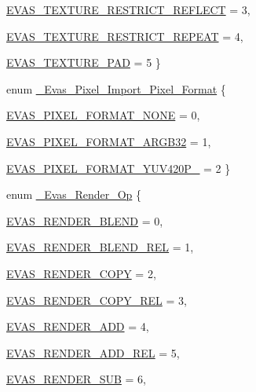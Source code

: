 \begin{DoxyCompactItemize}
\par
\hyperlink{Evas_8h_a830349cff0c676505905e79e1db0f738a34c9c1dc969b6a96aa9d38dbf8243f85}{EVAS\_\-TEXTURE\_\-RESTRICT\_\-REFLECT} =  3, 
\par
\hyperlink{Evas_8h_a830349cff0c676505905e79e1db0f738aa837b70d06a327c423456b5344163f43}{EVAS\_\-TEXTURE\_\-RESTRICT\_\-REPEAT} =  4, 
\par
\hyperlink{Evas_8h_a830349cff0c676505905e79e1db0f738ac27f6480a50fbbc564741b6bc6423ee7}{EVAS\_\-TEXTURE\_\-PAD} =  5
 \}
\item 
enum \hyperlink{Evas_8h_a8f3b6286e8954884b903666f50e12b59}{\_\-Evas\_\-Pixel\_\-Import\_\-Pixel\_\-Format} \{ \par
\hyperlink{Evas_8h_a8f3b6286e8954884b903666f50e12b59a38b6e0b8714c725eefee0555ec8fc8d2}{EVAS\_\-PIXEL\_\-FORMAT\_\-NONE} =  0, 
\par
\hyperlink{Evas_8h_a8f3b6286e8954884b903666f50e12b59a3da18654718f56c1fd90701297b4e78a}{EVAS\_\-PIXEL\_\-FORMAT\_\-ARGB32} =  1, 
\par
\hyperlink{Evas_8h_a8f3b6286e8954884b903666f50e12b59a42a1c5ed38b3356bb3dbbfe6ddc593b8}{EVAS\_\-PIXEL\_\-FORMAT\_\-YUV420P\_} =  2
 \}
\item 
enum \hyperlink{group__Evas__Object__Group__Extras_ga551375283a5e2b0abffd5f40582e9ce2}{\_\-Evas\_\-Render\_\-Op} \{ \par
\hyperlink{group__Evas__Object__Group__Extras_gga551375283a5e2b0abffd5f40582e9ce2ade640652f7342e2e2151bb7bd0bee31e}{EVAS\_\-RENDER\_\-BLEND} =  0, 
\par
\hyperlink{group__Evas__Object__Group__Extras_gga551375283a5e2b0abffd5f40582e9ce2af49b4dbb7b8c61b595f143c7415b9eb7}{EVAS\_\-RENDER\_\-BLEND\_\-REL} =  1, 
\par
\hyperlink{group__Evas__Object__Group__Extras_gga551375283a5e2b0abffd5f40582e9ce2a695c8ae11f59b4b5cd9907767ff5e7bd}{EVAS\_\-RENDER\_\-COPY} =  2, 
\par
\hyperlink{group__Evas__Object__Group__Extras_gga551375283a5e2b0abffd5f40582e9ce2a7e4cca2acc2088c71cdebca03d7e3cea}{EVAS\_\-RENDER\_\-COPY\_\-REL} =  3, 
\par
\hyperlink{group__Evas__Object__Group__Extras_gga551375283a5e2b0abffd5f40582e9ce2a950b6045d15e439b98badc63d9c52926}{EVAS\_\-RENDER\_\-ADD} =  4, 
\par
\hyperlink{group__Evas__Object__Group__Extras_gga551375283a5e2b0abffd5f40582e9ce2a7771ae083fb87f50a203cc643cb670cc}{EVAS\_\-RENDER\_\-ADD\_\-REL} =  5, 
\par
\hyperlink{group__Evas__Object__Group__Extras_gga551375283a5e2b0abffd5f40582e9ce2a3183f3f43c243373ca0d63e134342e27}{EVAS\_\-RENDER\_\-SUB} =  6, 

\end{DoxyCompactItemize}
